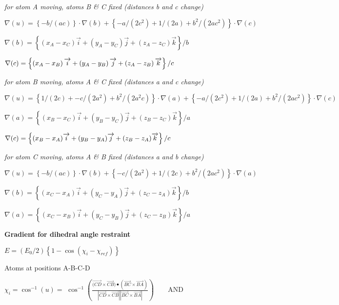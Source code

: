 {\em for atom A moving, atoms B \& C fixed (distances b and c
change)}

$\nabla (u)=\left\{ -b/\left( ac\right) \right\} \cdot \nabla (b)+\left\{
-a/\left( 2c^{2}\right) +1/\left( 2a\right) +b^{2}/\left( 2ac^{2}\right)
\right\} \cdot \nabla (c)$

$\nabla (b)=\left\{ \left( x_{A}-x_{C}\right) \overrightarrow{i}+\left(
y_{A}-y_{C}\right) \overrightarrow{j}+\left( z_{A}-z_{C}\right) 
\overrightarrow{k}\right\} /b$

$\nabla (c)=\left\{ \left( x_{A}-x_{B}\right) \overrightarrow{i}+\left(
y_{A}-y_{B}\right) \overrightarrow{j}+\left( z_{A}-z_{B}\right) 
\overrightarrow{k}\right\} /c\medskip $

{\em for atom B moving, atoms A \& C fixed (distances a and c
change)}

$\nabla (u)=\left\{ 1/(2c)+-c/(2a^{2})+b^{2}/(2a^{2}c)\right\} \cdot \nabla
(a)+\left\{ -a/\left( 2c^{2}\right) +1/(2a)+b^{2}/\left( 2ac^{2}\right)
\right\} \cdot \nabla (c)$

$\nabla (a)=\left\{ (x_{B}-x_{C})\overrightarrow{i}+(y_{B}-y_{C})%
\overrightarrow{j}+(z_{B}-z_{C})\overrightarrow{k}\right\} /a$

$\nabla (c)=\left\{ (x_{B}-x_{A})\overrightarrow{i}+(y_{B}-y_{A})%
\overrightarrow{j}+(z_{B}-z_{A})\overrightarrow{k}\right\} /c\medskip $

{\em for atom C moving, atoms A \& B fixed (distances a and b
change)}

$\nabla (u)=\left\{ -b/\left( ac\right) \right\} \cdot \nabla (b)+\left\{
-c/\left( 2a^{2}\right) +1/(2c)+b^{2}/\left( 2ac^{2}\right) \right\} \cdot 
\nabla (a)$

$\nabla (b)=\left\{ (x_{C}-x_{A})\overrightarrow{i}+(y_{C}-y_{A})%
\overrightarrow{j}+(z_{C}-z_{A})\overrightarrow{k}\right\} /b$

$\nabla (a)=\left\{ (x_{C}-x_{B})\overrightarrow{i}+(y_{C}-y_{B})%
\overrightarrow{j}+(z_{C}-z_{B})\overrightarrow{k}\right\} /a $

{\bf Gradient for dihedral angle restraint}

$E=(E_{0}/2)\left\{ 1-\cos \left( \chi _{i}-\chi _{ref}\right) \right\} $

Atoms at positions A-B-C-D

$\chi _{i}=\cos ^{-1}(u)=$ $\cos ^{-1}\left( \frac{\overrightarrow{(CD}%
\times \overrightarrow{CB})\bullet (\overrightarrow{BC}\times 
\overrightarrow{BA})}{\left| \overrightarrow{CD}\times \overrightarrow{CB}%
\right| \left| \overrightarrow{BC}\times \overrightarrow{BA}\right| }\right)
\qquad $AND

